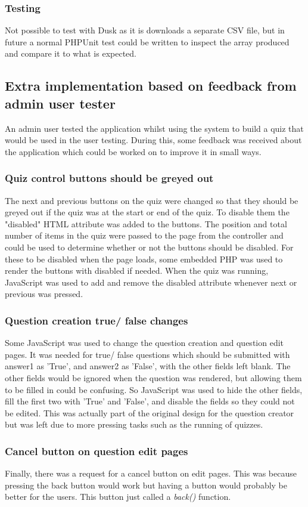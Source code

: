 \subsubsection{Testing}
Not possible to test with Dusk as it is downloads a separate CSV file, but in future a normal PHPUnit test could be written to inspect the array produced and compare it to what is expected.
\newpage

\subsection{Extra implementation based on feedback from admin user tester}
An admin user tested the application whilst using the system to build a quiz that would be used in the user testing. During this, some feedback was received about the application which could be worked on to improve it in small ways.
\subsubsection{Quiz control buttons should be greyed out}
The next and previous buttons on the quiz were changed so that they should be greyed out if the quiz was at the start or end of the quiz. To disable them the "disabled" HTML attribute was added to the buttons. The position and total number of items in the quiz were passed to the page from the controller and could be used to determine whether or not the buttons should be disabled. For these to be disabled when the page loads, some embedded PHP was used to render the buttons with disabled if needed. When the quiz was running, JavaScript was used to add and remove the disabled attribute whenever next or previous was pressed.
\subsubsection{Question creation true/ false changes}
Some JavaScript was used to change the question creation and question edit pages. It was needed for true/ false questions which should be submitted with answer1 as 'True', and answer2 as 'False', with the other fields left blank. The other fields would be ignored when the question was rendered, but allowing them to be filled in could be confusing. So JavaScript was used to hide the other fields, fill the first two with 'True' and 'False', and disable the fields so they could not be edited. This was actually part of the original design for the question creator but was left due to more pressing tasks such as the running of quizzes.
\subsubsection{Cancel button on question edit pages}
Finally, there was a request for a cancel button on edit pages. This was because pressing the back button would work but having a button would probably be better for the users. This button just called a \textit{back()} function.

